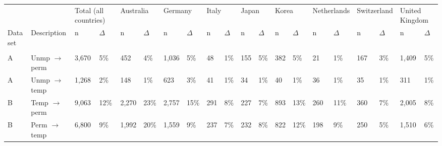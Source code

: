 \begin{tabular}{llllllllllllllllllll}
   \toprule 
 
&  & 
\multicolumn{2}{l}{Total (all countries)} &
\multicolumn{2}{l}{Australia} &
\multicolumn{2}{l}{Germany} &
\multicolumn{2}{l}{Italy} &
\multicolumn{2}{l}{Japan} &
\multicolumn{2}{l}{Korea} &
\multicolumn{2}{l}{Netherlands} &
\multicolumn{2}{l}{Switzerland} &
\multicolumn{2}{l}{United Kingdom}
\\  
 
 
\multicolumn{1}{l}{Data set} & 
\multicolumn{1}{l}{Description} 
& n & $\Delta$
& n & $\Delta$
& n & $\Delta$
& n & $\Delta$
& n & $\Delta$
& n & $\Delta$
& n & $\Delta$
& n & $\Delta$
& n & $\Delta$
\\ 
\cmidrule(lr){1-2}
\cmidrule(lr){3-4}
\cmidrule(lr){5-6}
\cmidrule(lr){7-8}
\cmidrule(lr){9-10}
\cmidrule(lr){11-12}
\cmidrule(lr){13-14}
\cmidrule(lr){15-16}
\cmidrule(lr){17-18}
\cmidrule(lr){19-20}
\\[-1.8ex]  
 
A & Unmp $\rightarrow$ perm & 3,670 & 5\% & 452 & 4\% & 1,036 & 5\% & 48 & 1\% & 155 & 5\% & 382 & 5\% & 21 & 1\% & 167 & 3\% & 1,409 & 5\% \\ 
  A & Unmp $\rightarrow$ temp & 1,268 & 2\% & 148 & 1\% & 623 & 3\% & 41 & 1\% & 34 & 1\% & 40 & 1\% & 36 & 1\% & 35 & 1\% & 311 & 1\% \\ 
  B & Temp $\rightarrow$ perm & 9,063 & 12\% & 2,270 & 23\% & 2,757 & 15\% & 291 & 8\% & 227 & 7\% & 893 & 13\% & 260 & 11\% & 360 & 7\% & 2,005 & 8\% \\ 
  B & Perm $\rightarrow$ temp & 6,800 & 9\% & 1,992 & 20\% & 1,559 & 9\% & 237 & 7\% & 232 & 8\% & 822 & 12\% & 198 & 9\% & 250 & 5\% & 1,510 & 6\% \\ 
   \bottomrule 
\end{tabular}
